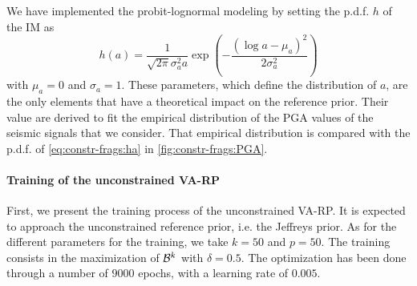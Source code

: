 We have implemented the probit-lognormal modeling by setting the p.d.f. $h$ of the IM as
    \begin{equation}\label{eq:constr-frags:ha}
        h(a) = \frac{1}{\sqrt{2\pi}\sigma_a^2 a}\exp\left(-\frac{(\log a-\mu_a)^2}{2\sigma_a^2}\right)
    \end{equation}
with
$\mu_a=0$ and $\sigma_a=1$. These parameters, which define the distribution of $a$, are the only elements that have a theoretical impact on the reference prior.
Their value are derived to fit the empirical distribution of the PGA values of the seismic signals that we consider. That empirical distribution is compared with the p.d.f. of \cref{eq:constr-frags:ha} in \cref{fig:constr-frags:PGA}.





\paragraph{Training of the unconstrained VA-RP}
First, we present the training process of the unconstrained VA-RP. It is expected to approach the unconstrained reference prior, i.e. the Jeffreys prior. 
As for the different parameters 
for the training, we take $k=50$ and $p=50$. The training consists in the maximization of $\mathcal{B}^k$ with $\delta=0.5$. 
The optimization has been done through a number of $9000$ epochs, with a learning rate of $0.005$.


